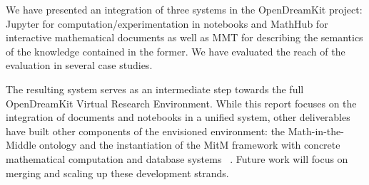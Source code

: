 We have presented an integration of three systems in the OpenDreamKit project:
Jupyter for computation/experimentation in notebooks and MathHub for interactive mathematical documents as well as MMT for describing the semantics of the knowledge contained in the former.
We have evaluated the reach of the evaluation in several case studies.

The resulting system serves as an intermediate step towards the full OpenDreamKit Virtual Research Environment.
While this report focuses on the integration of documents and notebooks in a unified system, other deliverables have built other components of the envisioned environment: the Math-in-the-Middle ontology \cite{ODK-D6.8} and the instantiation of the MitM framework with concrete mathematical computation and database systems ~\cite{ODK-D6.5}.
Future work will focus on merging and scaling up these development strands.


